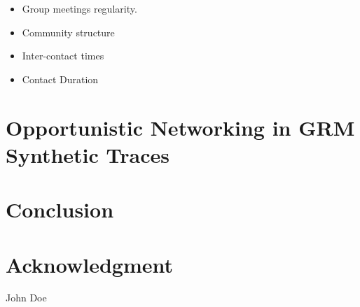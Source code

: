 \documentclass[10pt, conference, letterpaper]{IEEEtran}
\begin{document}
\begin{itemize}
    \item Group meetings regularity.
    \item Community structure
    \item Inter-contact times
    \item Contact Duration
\end{itemize}


\section{Opportunistic Networking in GRM Synthetic Traces}



\section{Conclusion}\label{conclusion}



\section*{Acknowledgment}

\ifCLASSOPTIONcaptionsoff
  \newpage
\fi




\begin{IEEEbiography}{John Doe}

\end{IEEEbiography}
\end{document}
